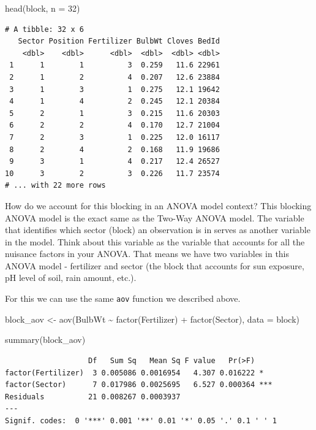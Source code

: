 \documentclass[
  letterpaper,
  DIV=11,
  numbers=noendperiod]{scrreprt}
\newenvironment{Shaded}{\begin{snugshade}}{\end{snugshade}}
\newcommand{\AttributeTok}[1]{\textcolor[rgb]{0.40,0.45,0.13}{#1}}
\newcommand{\DecValTok}[1]{\textcolor[rgb]{0.68,0.00,0.00}{#1}}
\newcommand{\FunctionTok}[1]{\textcolor[rgb]{0.28,0.35,0.67}{#1}}
\newcommand{\NormalTok}[1]{\textcolor[rgb]{0.00,0.23,0.31}{#1}}
\newcommand{\OtherTok}[1]{\textcolor[rgb]{0.00,0.23,0.31}{#1}}
\newcommand{\SpecialCharTok}[1]{\textcolor[rgb]{0.37,0.37,0.37}{#1}}
\begin{document}
\begin{Shaded}
\begin{Highlighting}[]
\FunctionTok{head}\NormalTok{(block, }\AttributeTok{n =} \DecValTok{32}\NormalTok{)}
\end{Highlighting}
\end{Shaded}

\begin{verbatim}
# A tibble: 32 x 6
   Sector Position Fertilizer BulbWt Cloves BedId
    <dbl>    <dbl>      <dbl>  <dbl>  <dbl> <dbl>
 1      1        1          3  0.259   11.6 22961
 2      1        2          4  0.207   12.6 23884
 3      1        3          1  0.275   12.1 19642
 4      1        4          2  0.245   12.1 20384
 5      2        1          3  0.215   11.6 20303
 6      2        2          4  0.170   12.7 21004
 7      2        3          1  0.225   12.0 16117
 8      2        4          2  0.168   11.9 19686
 9      3        1          4  0.217   12.4 26527
10      3        2          3  0.226   11.7 23574
# ... with 22 more rows
\end{verbatim}

How do we account for this blocking in an ANOVA model context? This
blocking ANOVA model is the exact same as the Two-Way ANOVA model. The
variable that identifies which sector (block) an observation is in
serves as another variable in the model. Think about this variable as
the variable that accounts for all the nuisance factors in your ANOVA.
That means we have two variables in this ANOVA model - fertilizer and
sector (the block that accounts for sun exposure, pH level of soil, rain
amount, etc.).

For this we can use the same \texttt{aov} function we described above.

\begin{Shaded}
\begin{Highlighting}[]
\NormalTok{block\_aov }\OtherTok{\textless{}{-}} \FunctionTok{aov}\NormalTok{(BulbWt }\SpecialCharTok{\textasciitilde{}} \FunctionTok{factor}\NormalTok{(Fertilizer) }\SpecialCharTok{+} \FunctionTok{factor}\NormalTok{(Sector), }\AttributeTok{data =}\NormalTok{ block)}

\FunctionTok{summary}\NormalTok{(block\_aov)}
\end{Highlighting}
\end{Shaded}

\begin{verbatim}
                   Df   Sum Sq   Mean Sq F value   Pr(>F)    
factor(Fertilizer)  3 0.005086 0.0016954   4.307 0.016222 *  
factor(Sector)      7 0.017986 0.0025695   6.527 0.000364 ***
Residuals          21 0.008267 0.0003937                     
---
Signif. codes:  0 '***' 0.001 '**' 0.01 '*' 0.05 '.' 0.1 ' ' 1
\end{verbatim}
\end{document}
